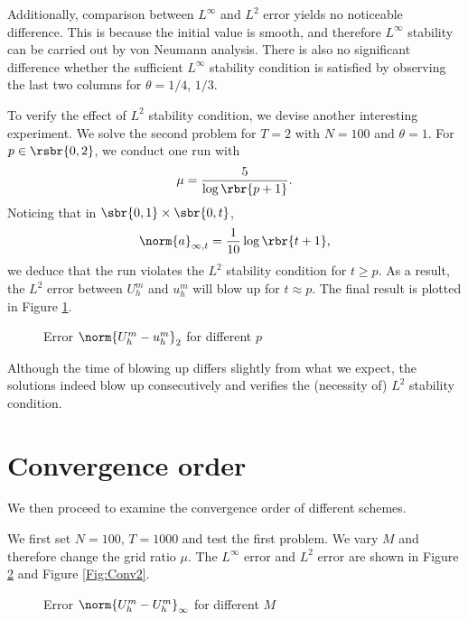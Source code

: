 \documentclass[english, nochinese]{pnote}
\begin{document}
Additionally, comparison between $L^{\infty}$ and $L^2$ error yields no noticeable difference. This is because the initial value is smooth, and therefore $L^{\infty}$ stability can be carried out by von Neumann analysis. There is also no significant difference whether the sufficient $L^{\infty}$ stability condition is satisfied by observing the last two columns for $ \theta = 1 / 4 $, $ 1 / 3 $.

To verify the effect of $L^2$ stability condition, we devise another interesting experiment. We solve the second problem for $ T = 2 $ with $ N = 100 $ and $ \theta = 1 $. For $ p \in \rsbr{ 0, 2 } $, we conduct one run with
\begin{equation}
\mu = \frac{5}{ \log \rbr{ p + 1 } }.
\end{equation}
Noticing that in $ \sbr{ 0, 1 } \times \sbr{ 0, t } $,
\begin{equation}
\norm{a}_{ \infty, t } = \frac{1}{10} \log \rbr{ t + 1 },
\end{equation}
we deduce that the run violates the $L^2$ stability condition for $ t \ge p $. As a result, the $L^2$ error between $U_h^m$ and $u_h^m$ will blow up for $ t \approx p $. The final result is plotted in Figure \ref{Fig:Blow}.

\begin{figure}[htbp]
\centering

\caption{Error $ \norm{ U_h^m - u_h^m }_2 $ for different $p$}
\label{Fig:Blow}
\end{figure}

Although the time of blowing up differs slightly from what we expect, the solutions indeed blow up consecutively and verifies the (necessity of) $L^2$ stability condition.

\section{Convergence order}

We then proceed to examine the convergence order of different schemes.

We first set $ N = 100 $, $ T = 1000 $ and test the first problem. We vary $M$ and therefore change the grid ratio $\mu$. The $L^{\infty}$ error and $L^2$ error are shown in Figure \ref{Fig:ConvI} and Figure \ref{Fig:Conv2}.

\begin{figure}[htbp]
\centering
\scalebox{0.75}{}
\caption{Error $ \norm{ U_h^m - U_h^m }_{\infty} $ for different $M$}
\label{Fig:ConvI}
\end{figure}
\end{document}
